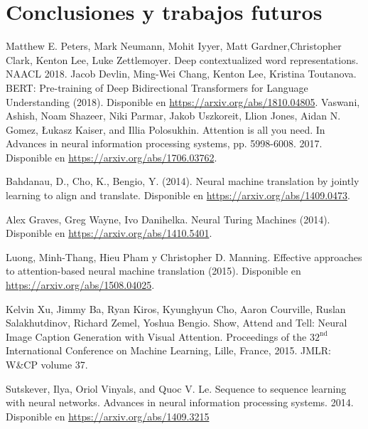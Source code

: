 \documentclass[conference]{IEEEtran}
\begin{document}
\section{Conclusiones y trabajos futuros}
\begin{thebibliography}{00}
Matthew E. Peters, Mark Neumann, Mohit Iyyer, Matt Gardner,Christopher Clark, Kenton Lee, Luke Zettlemoyer. Deep contextualized word representations. NAACL 2018.
Jacob Devlin, Ming-Wei Chang, Kenton Lee, Kristina Toutanova. BERT: Pre-training of Deep Bidirectional Transformers for Language Understanding (2018). Disponible en \href{https://arxiv.org/abs/1810.04805}{https://arxiv.org/abs/1810.04805}.
 Vaswani, Ashish, Noam Shazeer, Niki Parmar, Jakob Uszkoreit, Llion Jones, Aidan N. Gomez, Łukasz Kaiser, and Illia Polosukhin. Attention is all you need. In Advances in neural information processing systems, pp. 5998-6008. 2017. Disponible en \href{https://arxiv.org/abs/1706.03762}{https://arxiv.org/abs/1706.03762}.

 Bahdanau, D., Cho, K., Bengio, Y. (2014). Neural machine translation by jointly learning to align and translate. Disponible en \href{https://arxiv.org/abs/1409.0473}{https://arxiv.org/abs/1409.0473}.

Alex Graves, Greg Wayne, Ivo Danihelka. Neural Turing Machines (2014). Disponible en \href{https://arxiv.org/abs/1410.5401}{https://arxiv.org/abs/1410.5401}.

Luong, Minh-Thang, Hieu Pham y  Christopher D. Manning. Effective approaches to attention-based neural machine translation (2015). Disponible en \href{https://arxiv.org/abs/1508.04025}{https://arxiv.org/abs/1508.04025}.

 Kelvin Xu, Jimmy Ba, Ryan Kiros, Kyunghyun Cho, Aaron Courville, Ruslan Salakhutdinov, Richard Zemel, Yoshua Bengio. Show, Attend and Tell: Neural Image Caption Generation with Visual Attention. Proceedings  of  the $32^{\text{nd}}$ International  Conference  on  Machine Learning, Lille, France, 2015.  JMLR: W\&CP volume 37.

Sutskever, Ilya, Oriol Vinyals, and Quoc V. Le. Sequence to sequence learning with neural networks. Advances in neural information processing systems. 2014. Disponible en \href{https://arxiv.org/abs/1409.3215}{https://arxiv.org/abs/1409.3215}


\end{thebibliography}
\end{document}
